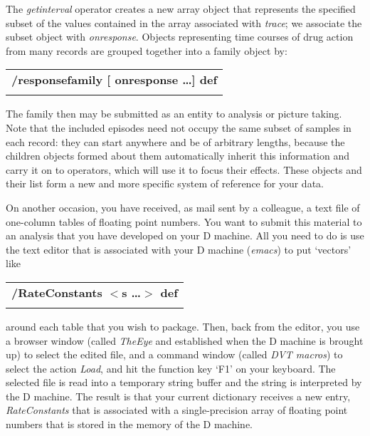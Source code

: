 \noindent The  \emph{getinterval} operator creates a new array object  that  represents the specified subset of the values contained in the array associated with \emph{trace}; we associate the subset object with \emph{onresponse}. Objects representing time courses of drug action from many records are grouped together into  a  family object by:\\

\begin{tabular}{>{\sffamily\bfseries}l}
  /responsefamily [ onresponse \ldots ] def\\\\
\end{tabular}

\noindent The  family  then may be submitted as an entity to analysis  or  picture taking.  Note  that  the included episodes need not occupy the  same  subset  of samples  in  each record:  they can start anywhere and  be  of  arbitrary lengths, because the children objects formed about them automatically inherit this information  and  carry it on to operators,  which will use it  to  focus their effects. These objects and their list form a new and more specific system of reference for your data.

On another occasion, you have received, as mail sent by a colleague, a text file of one-column tables of floating  point numbers.  You  want to submit this material to an analysis that you  have developed on your D machine.  All you need to do is use the text editor that is associated with your D machine (\emph{emacs}) to put `vectors' like\\

\begin{tabular}{>{\sffamily\bfseries}l}
 /RateConstants $<$s \ldots $>$ def\\\\
\end{tabular}

\noindent around each table that you wish to package.  Then,  back from the editor, you use a browser window (called \emph{TheEye} and established when the D machine is brought up) to select the edited file, and a command window (called \emph{DVT macros}) to select the action \emph{Load}, and hit the function key `F1' on your keyboard. The selected file is read into a temporary string buffer and the string is interpreted by the D machine. The result is that your current dictionary receives a new entry, \emph{RateConstants} that is associated with a single-precision array of floating point numbers that is stored in the memory of the D machine.  

